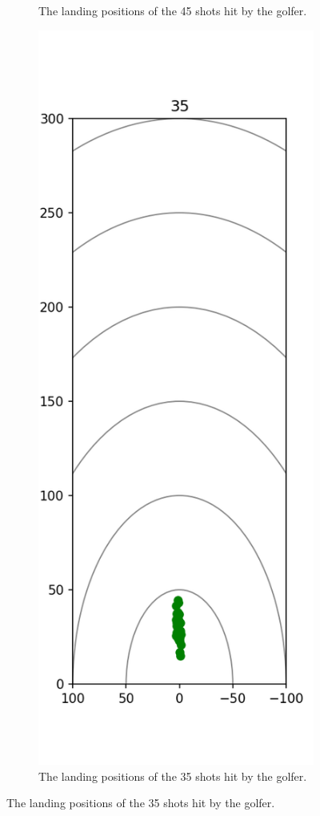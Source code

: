 \documentclass{kththesis}
\begin{document}
\begin{figure}
\begin{subfigure}{0.4\textwidth}
    \caption{The landing positions of the 45 shots hit by the golfer.}
    \label{fig:45_shots}
    \end{subfigure}
    \begin{subfigure}{0.4\textwidth}
    \centering
    \includegraphics[height=0.4\textheight]{Shots/35_shots.png} 
    \caption{The landing positions of the 35 shots hit by the golfer.}
    \label{fig:35_shots}
    \end{subfigure}
\end{figure}
\end{document}
